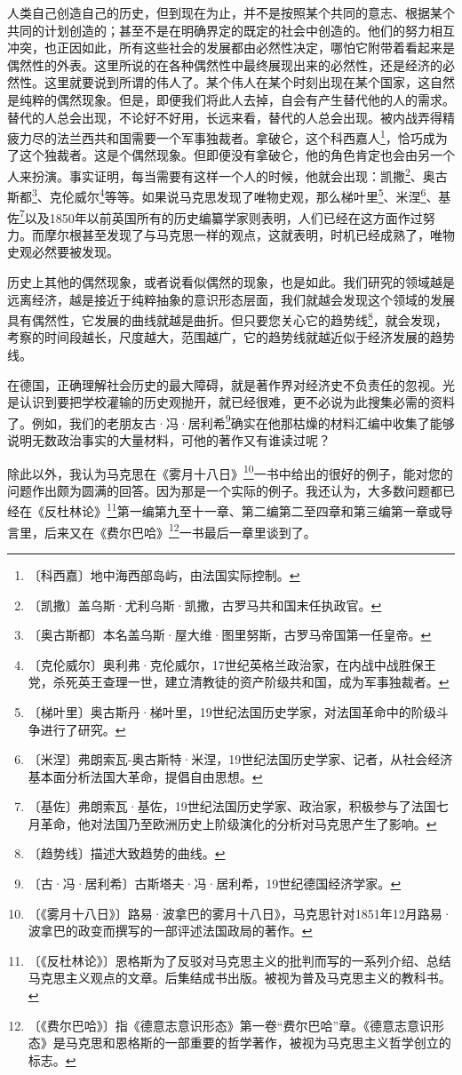 \documentclass[12pt,UTF-8,openany]{ctexbook}
\begin{document}
\begin{large}
    人类自己创造自己的历史，但到现在为止，并不是按照某个共同的意志、根据某个共同的计划创造的；甚至不是在明确界定的既定的社会中创造的。他们的努力相互冲突，也正因如此，所有这些社会的发展都由必然性决定，哪怕它附带着看起来是偶然性的外表。这里所说的在各种偶然性中最终展现出来的必然性，还是经济的必然性。这里就要说到所谓的伟人了。某个伟人在某个时刻出现在某个国家，这自然是纯粹的偶然现象。但是，即便我们将此人去掉，自会有产生替代他的人的需求。替代的人总会出现，不论好不好用，长远来看，替代的人总会出现。被内战弄得精疲力尽的法兰西共和国需要一个军事独裁者。拿破仑，这个科西嘉人\footnote{〔科西嘉〕地中海西部岛屿，由法国实际控制。}，恰巧成为了这个独裁者。这是个偶然现象。但即便没有拿破仑，他的角色肯定也会由另一个人来扮演。事实证明，每当需要有这样一个人的时候，他就会出现：凯撒\footnote{〔凯撒〕盖乌斯·尤利乌斯·凯撒，古罗马共和国末任执政官。}、奥古斯都\footnote{〔奥古斯都〕本名盖乌斯·屋大维·图里努斯，古罗马帝国第一任皇帝。}、克伦威尔\footnote{〔克伦威尔〕奥利弗·克伦威尔，17世纪英格兰政治家，在内战中战胜保王党，杀死英王查理一世，建立清教徒的资产阶级共和国，成为军事独裁者。}等等。如果说马克思发现了唯物史观，那么梯叶里\footnote{〔梯叶里〕奥古斯丹·梯叶里，19世纪法国历史学家，对法国革命中的阶级斗争进行了研究。}、米涅\footnote{〔米涅〕弗朗索瓦-奥古斯特·米涅，19世纪法国历史学家、记者，从社会经济基本面分析法国大革命，提倡自由思想。}、基佐\footnote{〔基佐〕弗朗索瓦·基佐，19世纪法国历史学家、政治家，积极参与了法国七月革命，他对法国乃至欧洲历史上阶级演化的分析对马克思产生了影响。}以及1850年以前英国所有的历史编纂学家则表明，人们已经在这方面作过努力。而摩尔根甚至发现了与马克思一样的观点，这就表明，时机已经成熟了，唯物史观必然要被发现。
    
    历史上其他的偶然现象，或者说看似偶然的现象，也是如此。我们研究的领域越是远离经济，越是接近于纯粹抽象的意识形态层面，我们就越会发现这个领域的发展具有偶然性，它发展的曲线就越是曲折。但只要您关心它的趋势线\footnote{〔趋势线〕描述大致趋势的曲线。}，就会发现，考察的时间段越长，尺度越大，范围越广，它的趋势线就越近似于经济发展的趋势线。
    
    在德国，正确理解社会历史的最大障碍，就是著作界对经济史不负责任的忽视。光是认识到要把学校灌输的历史观抛开，就已经很难，更不必说为此搜集必需的资料了。例如，我们的老朋友古·冯·居利希\footnote{〔古·冯·居利希〕古斯塔夫·冯·居利希，19世纪德国经济学家。}确实在他那枯燥的材料汇编中收集了能够说明无数政治事实的大量材料，可他的著作又有谁读过呢？
    
    除此以外，我认为马克思在《雾月十八日》\footnote{〔《雾月十八日》〕路易·波拿巴的雾月十八日》，马克思针对1851年12月路易·波拿巴的政变而撰写的一部评述法国政局的著作。}一书中给出的很好的例子，能对您的问题作出颇为圆满的回答。因为那是一个实际的例子。我还认为，大多数问题都已经在《反杜林论》\footnote{〔《反杜林论》〕恩格斯为了反驳对马克思主义的批判而写的一系列介绍、总结马克思主义观点的文章。后集结成书出版。被视为普及马克思主义的教科书。}第一编第九至十一章、第二编第二至四章和第三编第一章或导言里，后来又在《费尔巴哈》\footnote{〔《费尔巴哈》〕指《德意志意识形态》第一卷“费尔巴哈”章。《德意志意识形态》是马克思和恩格斯的一部重要的哲学著作，被视为马克思主义哲学创立的标志。}一书最后一章里谈到了。
    

\end{large}
\end{document}
